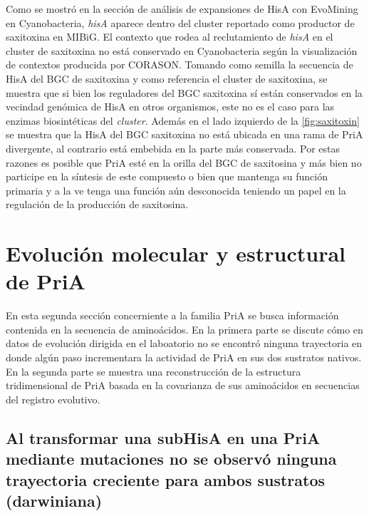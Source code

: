 \documentclass[12pt,twoside]{reedthesis}
\begin{document}
  Como se mostró en la sección de análisis de expansiones de HisA con
  EvoMining en Cyanobacteria, \emph{hisA} aparece dentro del cluster
  reportado como productor de saxitoxina en MIBiG. El contexto que rodea
  al reclutamiento de \emph{hisA} en el cluster de saxitoxina no está
  conservado en Cyanobacteria según la visualización de contextos
  producida por CORASON. Tomando como semilla la secuencia de HisA del BGC
  de saxitoxina y como referencia el cluster de saxitoxina, se muestra que
  si bien los reguladores del BGC saxitoxina sí están conservados en la
  vecindad genómica de HisA en otros organismos, este no es el caso para
  las enzimas biosintéticas del \emph{cluster}. Además en el lado
  izquierdo de la \autoref{fig:saxitoxin} se muestra que la HisA del BGC
  saxitoxina no está ubicada en una rama de PriA divergente, al contrario
  está embebida en la parte más conservada. Por estas razones es posible
  que PriA esté en la orilla del BGC de saxitosina y más bien no participe
  en la síntesis de este compuesto o bien que mantenga su función primaria
  y a la ve tenga una función aún desconocida teniendo un papel en la
  regulación de la producción de saxitosina.
  
  \section{Evolución molecular y estructural de
  PriA}\label{evolucion-molecular-y-estructural-de-pria}
  
  En esta segunda sección concerniente a la familia PriA se busca
  información contenida en la secuencia de aminoácidos. En la primera
  parte se discute cómo en datos de evolución dirigida en el laboatorio no
  se encontró ninguna trayectoria en donde algún paso incrementara la
  actividad de PriA en sus dos sustratos nativos. En la segunda parte se
  muestra una reconstrucción de la estructura tridimensional de PriA
  basada en la covarianza de sus aminoácidos en secuencias del registro
  evolutivo.
  
  \subsection{Al transformar una subHisA en una PriA mediante mutaciones
  no se observó ninguna trayectoria creciente para ambos sustratos
  (darwiniana)}\label{al-transformar-una-subhisa-en-una-pria-mediante-mutaciones-no-se-observo-ninguna-trayectoria-creciente-para-ambos-sustratos-darwiniana}
  
\end{document}
